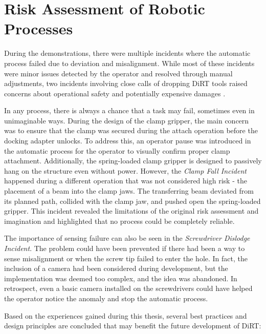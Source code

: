\section{Risk Assessment of Robotic Processes}
\label{section:discussion-risk-assessment-of-robotic-processes}

During the demonstrations, there were multiple incidents where the automatic process failed due to deviation and misalignment. While most of these incidents were minor issues detected by the operator and resolved through manual adjustments, two incidents involving close calls of dropping DiRT tools raised concerns about operational safety and potentially expensive damages .

In any process, there is always a chance that a task may fail, sometimes even in unimaginable ways. During the design of the clamp gripper, the main concern was to ensure that the clamp was secured during the attach operation before the docking adapter unlocks. To address this, an operator pause was introduced in the automatic process for the operator to visually confirm proper clamp attachment. Additionally, the spring-loaded clamp gripper is designed to passively hang on the structure even without power. However, the \textit{Clamp Fall Incident} happened during a different operation that was not considered high risk - the placement of a beam into the clamp jaws. The transferring beam deviated from its planned path, collided with the clamp jaw, and pushed open the spring-loaded gripper. This incident revealed the limitations of the original risk assessment and imagination and highlighted that no process could be completely reliable.

The importance of sensing failure can also be seen in the \textit{Screwdriver Dislodge Incident}. The problem could have been prevented if there had been a way to sense misalignment or when the screw tip failed to enter the hole. In fact, the inclusion of a camera had been considered during development, but the implementation was deemed too complex, and the idea was abandoned. In retrospect, even a basic camera installed on the screwdrivers could have helped the operator notice the anomaly and stop the automatic process. 

Based on the experiences gained during this thesis, several best practices and design principles are concluded that may benefit the future development of DiRT:

